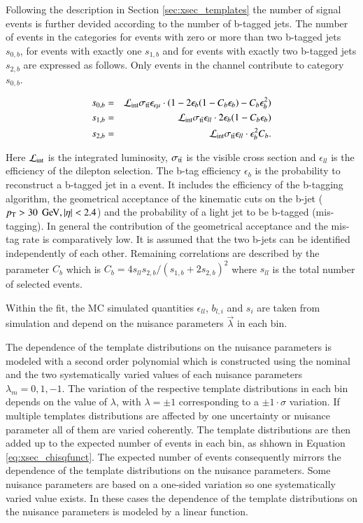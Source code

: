 Following the description in Section \ref{sec:xsec_templates}  the number of signal events is further devided according to the number of b-tagged jets.
The number of events in the categories for events with zero or more than two b-tagged jets $s_{0,b}$, for events with exactly one $s_{1,b}$ and for events with exactly two b-tagged jets $s_{2,b}$ are expressed as follows. Only events in the \emu channel contribute to category $s_{0,b}$.

\begin{eqnarray}
s_{0,b}  &=& \mathcal{L}_{\rm int}\sigma_\mathrm{t\bar{t}} \epsilon_{e\mu} \cdot (1-2\epsilon_b(1-C_b\epsilon_b)-C_b\epsilon_b^2) \\
s_{1,b}  &=& \mathcal{L}_{\rm int} \sigma_\mathrm{t\bar{t}} \epsilon_{ll} \cdot 2 \epsilon_b(1-C_b\epsilon_b) \\
s_{2,b}  &=& \mathcal{L}_{\rm int} \sigma_\mathrm{t\bar{t}} \epsilon_{ll} \cdot   \epsilon_b^2 C_b 
\label{eq:xsec_nb}.
\end{eqnarray}

Here $\mathcal{L}_{\rm int}$ is the integrated luminosity, $\sigma_\mathrm{t\bar{t}}$ is the visible \ttbar cross section and $\epsilon_{ll}$ is the efficiency of the dilepton selection.
The b-tag efficiency $\epsilon_b$ is the probability to reconstruct a b-tagged jet in a \ttbar event. It includes the efficiency of the b-tagging algorithm, the geometrical acceptance of the kinematic cuts on the b-jet ($p_{\mathrm{T}} > 30\; \,\text{Ge\hspace{-.08em}V}, |\eta|<2.4$) and the probability of a light jet to be b-tagged (mis-tagging). In general the contribution of the geometrical acceptance and the mis-tag rate is comparatively low.
It is assumed that the two b-jets can be identified independently of each other. Remaining correlations are described by the parameter $C_b$ which is
$C_b=4s_{ll}s_{2,b}/(s_{1,b}+2s_{2,b})^2$ where $s_{ll}$ is the total number of selected events. 


Within the fit, the MC simulated quantities $\epsilon_{ll}$, $b_{l,i}$ and $s_{i}$ are taken from simulation and depend on the nuisance parameters $\vec{\lambda}$ in each bin.

The dependence of the template distributions on the nuisance parameters is modeled with a second order polynomial which is constructed using the nominal and the two systematically varied values of each nuisance parameters $\lambda_m=0,1,-1$.
The variation of the respective template distributions in each bin depends on the value of $\lambda$, with $\lambda = \pm 1$ corresponding to a $ \pm 1 \cdot \sigma$ variation. If multiple templates distributions are affected by one uncertainty or nuisance parameter all of them are varied coherently.
The template distributions are then added up to the expected number of events in each bin, as shhown in Equation \ref{eq:xsec_chisqfunct}. The expected number of events consequently mirrors the dependence of the template distributions on the nuisance parameters.
Some nuisance parameters are based on a one-sided variation so one systematically varied value exists. In these cases the dependence of the template distributions on the nuisance parameters is modeled by a linear function.

